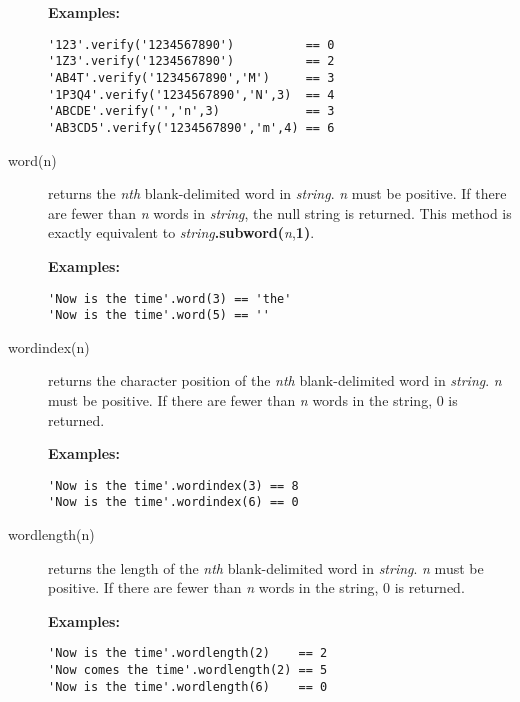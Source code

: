 \begin{description}
\textbf{Examples:}
\begin{lstlisting}
'123'.verify('1234567890')          == 0
'1Z3'.verify('1234567890')          == 2
'AB4T'.verify('1234567890','M')     == 3
'1P3Q4'.verify('1234567890','N',3)  == 4
'ABCDE'.verify('','n',3)            == 3
'AB3CD5'.verify('1234567890','m',4) == 6
\end{lstlisting}

\item[word(n)]\label{refword}
returns the \emph{n}\emph{th} blank-delimited word in
\emph{string}.
\emph{n} must be positive.
If there are fewer than \emph{n} words in \emph{string}, the
null string is returned.
This method is exactly equivalent to
\emph{string}\textbf{.subword(}\emph{n},\textbf{1)}.
 
\textbf{Examples:}
\begin{lstlisting}
'Now is the time'.word(3) == 'the'
'Now is the time'.word(5) == ''
\end{lstlisting}

\item[wordindex(n)]\label{refwordind}
returns the character position of the \emph{n}\emph{th}
blank-delimited word in \emph{string}.
\emph{n} must be positive.
If there are fewer than \emph{n} words in the string, 0 is returned.
 
\textbf{Examples:}
\begin{lstlisting}
'Now is the time'.wordindex(3) == 8
'Now is the time'.wordindex(6) == 0
\end{lstlisting}

\item[wordlength(n)]\label{refwordlen}
returns the length of the \emph{n}\emph{th} blank-delimited word in
\emph{string}.
\emph{n} must be positive.
If there are fewer than \emph{n} words in the string, 0 is returned.
 
\textbf{Examples:}
\begin{lstlisting}
'Now is the time'.wordlength(2)    == 2
'Now comes the time'.wordlength(2) == 5
'Now is the time'.wordlength(6)    == 0
\end{lstlisting}


\end{description}
